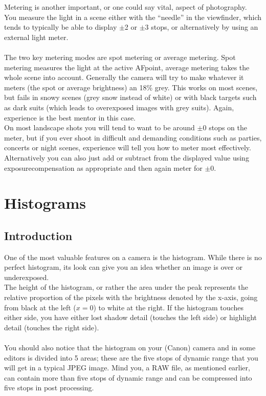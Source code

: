 Metering is another important, or one could say vital, aspect of photography.
\\
You measure the light in a scene either with the ``needle'' in the viewfinder, which tends to typically be able to display $\pm$2 or $\pm$3 stops, or alternatively by using an external light meter.
\\
\\
The two key metering modes are spot metering or average metering. Spot metering measures the light at the active \gls{AFpoint}, average metering takes the whole scene into account.
Generally the camera will try to make whatever it meters (the spot or average brightness) an 18\% grey. This works on most scenes, but fails in snowy scenes (grey snow instead of white) or with black targets such as dark suits (which leads to overexposed images with grey suits). Again, experience is the best mentor in this case.
\\
On most landscape shots you will tend to want to be around $\pm$0 stops on the meter, but if you ever shoot in difficult and demanding conditions such as parties, concerts or night scenes, experience will tell you how to meter most effectively. Alternatively you can also just add or subtract from the displayed value using \gls{exposurecompensation} as appropriate and then again meter for $\pm$0.

\section{Histograms}

\subsection{Introduction}

One of the most valuable features on a camera is the histogram. While there is no perfect histogram, its look can give you an idea whether an image is over or underexposed.
\\
The height of the histogram, or rather the area under the peak represents the relative proportion of the pixels with the brightness denoted by the x-axis, going from black at the left ($x=0$) to white at the right. If the histogram touches either side, you have either lost shadow detail (touches the left side) or highlight detail (touches the right side).
\\
\\
You should also notice that the histogram on your (Canon) camera and in some editors is divided into 5 areas; these are the five \glspl{stop} of dynamic range that you will get in a typical \gls{JPEG} image. Mind you, a \gls{RAW} file, as mentioned earlier, can contain more than five \glspl{stop} of dynamic range and can be compressed into five \glspl{stop} in post processing.

